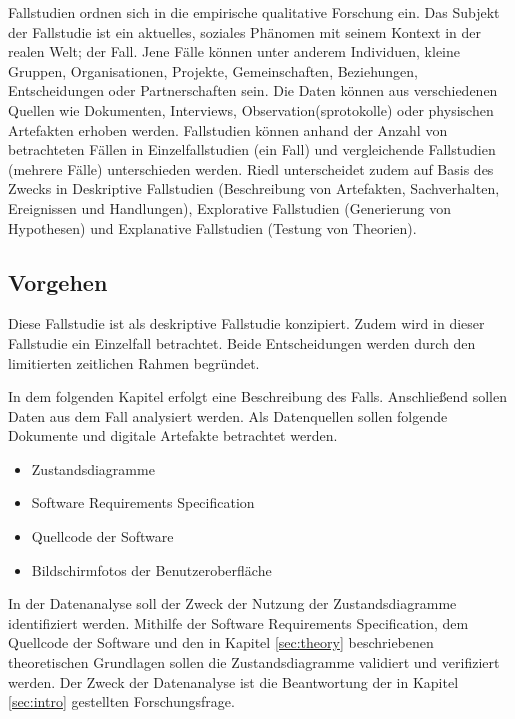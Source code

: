 \documentclass[first=Christoph,last=Hoentzsch,company=Softwareprojekt,location=Dresden,simple, noheader]{baarticle}
\begin{document}
\begin{basimple}
        Fallstudien ordnen sich in die empirische qualitative Forschung ein.
        Das Subjekt der Fallstudie ist ein aktuelles, soziales Phänomen mit seinem Kontext in der realen Welt; der Fall.
        Jene Fälle können unter anderem Individuen, kleine Gruppen, Organisationen, Projekte, Gemeinschaften, Beziehungen, Entscheidungen oder Partnerschaften sein.
        Die Daten können aus verschiedenen Quellen wie Dokumenten, Interviews, Observation(sprotokolle) oder physischen Artefakten erhoben werden.
        Fallstudien können anhand der Anzahl von betrachteten Fällen in Einzelfallstudien (ein Fall) und vergleichende Fallstudien (mehrere Fälle) unterschieden werden.
        Riedl unterscheidet zudem auf Basis des Zwecks in Deskriptive Fallstudien (Beschreibung von Artefakten, Sachverhalten, Ereignissen und Handlungen), Explorative Fallstudien (Generierung von Hypothesen) und Explanative Fallstudien (Testung von Theorien).

        \subsection{Vorgehen}
        Diese Fallstudie ist als deskriptive Fallstudie konzipiert. 
        Zudem wird in dieser Fallstudie ein Einzelfall betrachtet.
        Beide Entscheidungen werden durch den limitierten zeitlichen Rahmen begründet.
        
        In dem folgenden Kapitel erfolgt eine Beschreibung des Falls.
        Anschließend sollen Daten aus dem Fall analysiert werden.
        Als Datenquellen sollen folgende Dokumente und digitale Artefakte betrachtet werden.
        \begin{itemize}
            \item Zustandsdiagramme
            \item Software Requirements Specification
            \item Quellcode der Software
            \item Bildschirmfotos der Benutzeroberfläche
        \end{itemize}
        In der Datenanalyse soll der Zweck der Nutzung der Zustandsdiagramme identifiziert werden.
        Mithilfe der Software Requirements Specification, dem Quellcode der Software und den in Kapitel \ref{sec:theory} beschriebenen theoretischen Grundlagen sollen die Zustandsdiagramme validiert und verifiziert werden.
        Der Zweck der Datenanalyse ist die Beantwortung der in Kapitel \ref{sec:intro} gestellten Forschungsfrage.


\end{basimple}
\end{document}
